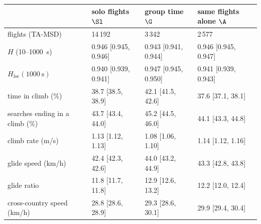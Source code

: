 \begin{tabular}{@{}l l l l@{}}
\toprule
 & solo flights $\Sl$ & group time $\G$ & same flights alone $\A$ \\
\midrule
flights (TA-MSD) & 14\,192 & 3\,342 & 2\,577 \\
$H$ (10--1000~s) & 0.946 [0.945, 0.946] & 0.943 [0.941, 0.944] & 0.946 [0.945, 0.947] \\
$H_\mathrm{loc}(1000~\mathrm{s})$ & 0.940 [0.939, 0.941] & 0.947 [0.945, 0.950] & 0.941 [0.939, 0.943] \\
time in climb (\%) & 38.7 [38.5, 38.9] & 42.1 [41.5, 42.6] & 37.6 [37.1, 38.1] \\
searches ending in a climb (\%) & 43.7 [43.4, 44.0] & 45.2 [44.5, 46.0] & 44.1 [43.3, 44.8] \\
climb rate (m/s) & 1.13 [1.12, 1.13] & 1.08 [1.06, 1.10] & 1.14 [1.12, 1.16] \\
glide speed (km/h) & 42.4 [42.3, 42.6] & 44.0 [43.2, 44.9] & 43.3 [42.8, 43.8] \\
glide ratio & 11.8 [11.7, 11.8] & 12.9 [12.6, 13.2] & 12.2 [12.0, 12.4] \\
cross-country speed (km/h) & 28.8 [28.6, 28.9] & 29.3 [28.6, 30.1] & 29.9 [29.4, 30.4] \\
\bottomrule
\end{tabular}
